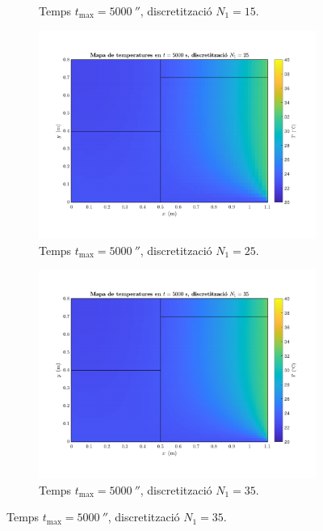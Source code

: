 \begin{figure}[ht]
\begin{subfigure}{.5\textwidth}
		\vspace{-15pt}
		\caption{Temps $t_\text{max} = 5000 \ \second$, discretització $N_1 = 15$.}
		\label{fig:malla_2}
	\end{subfigure}
	\begin{subfigure}{.5\textwidth}
		\centering
		\includegraphics[width=.95\linewidth]{imagenes/04_influencia/malla/malla_3.pdf}
		\vspace{-15pt}
		\caption{Temps $t_\text{max} = 5000 \ \second$, discretització $N_1 = 25$.}
		\label{fig:malla_3}
	\end{subfigure}%
	\begin{subfigure}{.5\textwidth}
		\centering
		\includegraphics[width=.95\linewidth]{imagenes/04_influencia/malla/malla_4.pdf}
		\vspace{-15pt}
		\caption{Temps $t_\text{max} = 5000 \ \second$, discretització $N_1 = 35$.}

\end{subfigure}
\end{figure}
